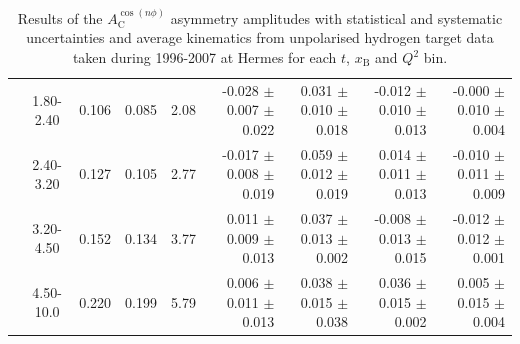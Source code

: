 \begin{table}[width=15cm]
\begin{center}
{\begin{tabular}{|c|c|c|c|c|r|r|r|r|}
& 1.80-2.40 &  0.106 & 0.085 &  2.08 &  -0.028  $\pm$  0.007  $\pm$   0.022 &
 0.031  $\pm$  0.010  $\pm$   0.018 & -0.012 $\pm$   0.010  $\pm$  0.013 & -0.000  $\pm$   0.010  $\pm$  0.004\\
& 2.40-3.20 &  0.127 &  0.105 & 2.77 &  -0.017 $\pm$   0.008  $\pm$   0.019 &  
0.059  $\pm$  0.012  $\pm$   0.019 & 0.014  $\pm$  0.011  $\pm$  0.013 & -0.010  $\pm$  0.011  $\pm$  0.009\\
& 3.20-4.50 &   0.152 & 0.134 &  3.77 &  0.011  $\pm$  0.009   $\pm$  0.013 & 
0.037 $\pm$   0.013  $\pm$   0.002 & -0.008  $\pm$  0.013 $\pm$ 0.015 & -0.012   $\pm$  0.012  $\pm$  0.001\\
& 4.50-10.0 & 0.220  & 0.199 & 5.79  &  0.006  $\pm$  0.011  $\pm$   0.013 & 
0.038  $\pm$  0.015  $\pm$  0.038 & 0.036 $\pm$   0.015  $\pm$  0.002 & 0.005   $\pm$  0.015   $\pm$   0.004\\
\hline
  \end{tabular}
}
 \end{center}
\caption{Results of the $A_{\textrm{C}}^{\cos(n\phi)}$ asymmetry amplitudes with statistical and systematic uncertainties and average kinematics from unpolarised hydrogen target data taken during 1996-2007 at H{\sc ermes} for each $t$, $x_{\textrm{B}}$ and $Q^{2}$ bin.}
\end{table}


